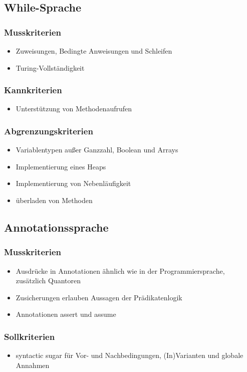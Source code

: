 \documentclass[a4paper,10pt]{article}
\begin{document}
\subsection{While-Sprache}
\subsubsection{Musskriterien}
\begin{itemize}
  \item Zuweisungen, Bedingte Anweisungen und Schleifen
  \item Turing-Vollst\"{a}ndigkeit
\end{itemize}
\subsubsection{Kannkriterien}
\begin{itemize}
  \item Unterst\"{u}tzung von Methodenaufrufen
\end{itemize}
\subsubsection{Abgrenzungskriterien}
\begin{itemize}
  \item Variablentypen au\ss{}er Ganzzahl, Boolean und Arrays
  \item Implementierung eines Heaps
  \item Implementierung von Nebenl\"{a}ufigkeit
  \item \"{u}berladen von Methoden
\end{itemize}

\subsection{Annotationssprache}
\subsubsection{Musskriterien}
\begin{itemize}
  \item Ausdr\"{u}cke in Annotationen \"{a}hnlich wie in der Programmiersprache, zus\"{a}tzlich Quantoren
  \item Zusicherungen erlauben Aussagen der Pr\"{a}dikatenlogik
  \item Annotationen assert und assume
\end{itemize}
\subsubsection{Sollkriterien}
\begin{itemize}
  \item syntactic sugar f\"{u}r Vor- und Nachbedingungen, (In)Varianten und globale Annahmen
\end{itemize}
\end{document}
